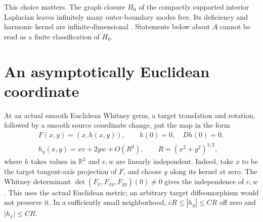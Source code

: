 \documentclass[11pt]{article}
\theoremstyle{remark}\newtheorem{remark}[theorem]{Remark}
\newcommand{\R}{\mathbb R}\newcommand{\C}{\mathbb C}
\begin{document}
This choice matters. The graph closure $H_0$ of the compactly supported
interior Laplacian leaves infinitely many outer-boundary modes free. Its
deficiency and harmonic kernel are infinite-dimensional \cite{v13}.
Statements below about $A$ cannot be read as a finite classification of $H_0$.

\section{An asymptotically Euclidean coordinate}\label{sec:coordinate}
At an actual smooth Euclidean Whitney germ, a target translation and rotation,
followed by a smooth source coordinate change, put the map in the form
\begin{equation}\label{eq:adapted}
 \begin{gathered}
 F(x,y)=(x,h(x,y)),\qquad h(0)=0,\quad Dh(0)=0,\\
 h_y(x,y)=xv+2yw+O(R^2),\qquad R=(x^2+y^2)^{1/2},
 \end{gathered}
\end{equation}
where $h$ takes values in $\R^2$ and $v,w$ are linearly independent.
Indeed, take $x$ to be the target tangent-axis projection of $F$, and choose
$y$ along its kernel at zero. The Whitney determinant
$\det(F_x,F_{xy},F_{yy})(0)\ne0$ gives the independence of $v,w$.
This uses the actual Euclidean metric; an arbitrary target diffeomorphism
would not preserve it. In a sufficiently small neighborhood,
$cR\leq|h_y|\leq CR$ off zero and $|h_x|\leq CR$.
\end{document}
